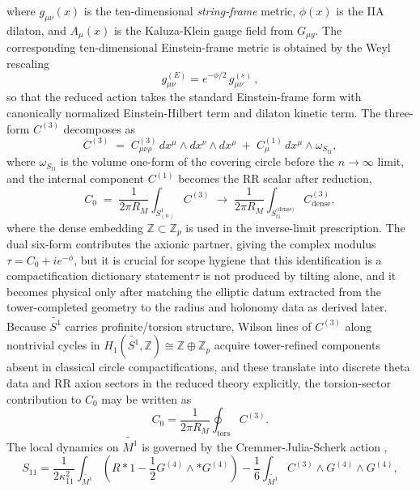\documentclass[11pt]{article}
\theoremstyle{remark}
\newcommand{\Z}{\mathbb{Z}}
\newcommand{\tS}{\widetilde{S^{1}}}
\newcommand{\tM}{\widetilde{M^{1}}}
\begin{document}
where $g_{\mu\nu}(x)$ is the ten-dimensional \emph{string-frame} metric, $\phi(x)$ is the IIA dilaton,
and $A_\mu(x)$ is the Kaluza-Klein gauge field from $G_{\mu y}$. The corresponding ten-dimensional
Einstein-frame metric is obtained by the Weyl rescaling
\begin{equation}\label{eq:IIA-Einstein-rescale}
g^{(E)}_{\mu\nu}=e^{-\phi/2}\,g^{(s)}_{\mu\nu}\,,
\end{equation}
so that the reduced action takes the standard Einstein-frame form with canonically normalized
Einstein-Hilbert term and dilaton kinetic term. The three-form \(C^{(3)}\) decomposes as
\begin{equation}
C^{(3)} \;=\; C^{(3)}_{\mu\nu\rho}\,dx^\mu\!\wedge dx^\nu\!\wedge dx^\rho 
      \;+\; C^{(1)}_{\mu}\,dx^\mu\!\wedge\omega_{S_{\mathrm f1}},
\end{equation}
where \(\omega_{S_{\mathrm f1}}\) is the volume one-form of the covering circle before the \(n\to\infty\) limit, and the internal component \(C^{(1)}\) becomes the RR scalar after reduction,
\begin{equation}
C_{0} \;=\; \frac1{2\pi R_{M}}\int_{S^{1}_{(n)}}C^{(3)} \;\longrightarrow\;
\frac1{2\pi R_{M}}\int_{S_{\mathrm f1}^{\text{(dense)}}}C^{(3)}_{\text{dense}},
\end{equation}
where the dense embedding \(\Z\subset\Z_p\) is used in the inverse-limit prescription. The dual six-form contributes the axionic partner, giving the complex modulus \(\tau=C_{0}+ie^{-\phi}\), but it is crucial for scope hygiene that this identification is a compactification dictionary statement\:\(\tau\) is not produced by tilting alone, and it becomes physical only after matching the elliptic datum extracted from the tower-completed geometry to the radius and holonomy data as derived later. Because \(\tS\) carries profinite/torsion structure, Wilson lines of \(C^{(3)}\) along nontrivial cycles in \(H_{1}(\tS,\Z)\cong \Z \oplus \Z_{p}\) acquire tower-refined components absent in classical circle compactifications, and these translate into discrete theta data and RR axion sectors in the reduced theory\; explicitly, the torsion-sector contribution to \(C_{0}\) may be written as
\begin{equation}
C_0 = \frac{1}{2\pi R_M} \oint_{\mathrm{tors}} C^{(3)}.
\end{equation}
The local dynamics on \(\tM\) is governed by the Cremmer-Julia-Scherk action \cite{CremmerJuliaScherk1978},
\begin{equation}
S_{11} = \frac{1}{2\kappa_{11}^2} \int_{\tM} \left( R * 1 - \frac{1}{2} G^{(4)} \wedge * G^{(4)} \right) - \frac{1}{6} \int_{\tM} C^{(3)} \wedge G^{(4)} \wedge G^{(4)},
\end{equation}
\end{document}
